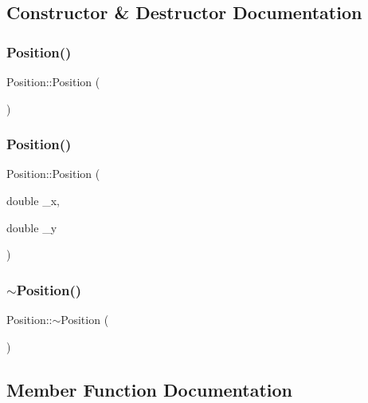 \subsection{Constructor \& Destructor Documentation}
\mbox{\label{class_position_a369a577425f8ba02e8750d04b6a088db}} 
\subsubsection{\texorpdfstring{Position()}{Position()}\hspace{0.1cm}{\footnotesize\ttfamily [1/2]}}
{\footnotesize\ttfamily Position\+::\+Position (\begin{DoxyParamCaption}{ }\end{DoxyParamCaption})}

\mbox{\label{class_position_a75efef3ff44bc0bd38f7f10abb3a53fe}} 
\subsubsection{\texorpdfstring{Position()}{Position()}\hspace{0.1cm}{\footnotesize\ttfamily [2/2]}}
{\footnotesize\ttfamily Position\+::\+Position (\begin{DoxyParamCaption}\item[{double}]{\+\_\+x,  }\item[{double}]{\+\_\+y }\end{DoxyParamCaption})}

\mbox{\label{class_position_abe83df4cab7af756636b4e39e4378f4a}} 
\subsubsection{\texorpdfstring{$\sim$\+Position()}{~Position()}}
{\footnotesize\ttfamily Position\+::$\sim$\+Position (\begin{DoxyParamCaption}{ }\end{DoxyParamCaption})}



\subsection{Member Function Documentation}
\mbox{\label{class_position_a961116b828f39200092daddffca2a63c}} 

